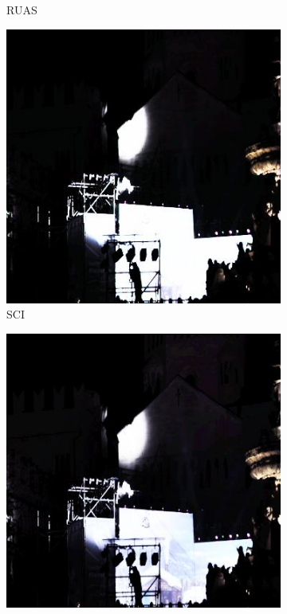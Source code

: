 \documentclass[a4paper]{ctexart}
\begin{document}
\begin{figure}[htb]
\begin{subfigure}{0.19\textwidth}
				\captionsetup{font=scriptsize}
				\caption{RUAS}
				\label{fig: RUAS2}
			\end{subfigure}
			\begin{subfigure}{0.19\textwidth}
				\includegraphics[width=\linewidth]{picture/LLIE/Experiment/SCI2}
				\captionsetup{font=scriptsize}
				\caption{SCI}
				\label{fig: SCI2}
			\end{subfigure}
			\begin{subfigure}{0.19\textwidth}
				\includegraphics[width=\linewidth]{picture/LLIE/Experiment/Zero-DCE++2}

\end{subfigure}
\end{figure}
\end{document}
